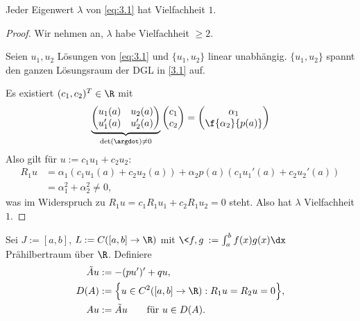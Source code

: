 \begin{st} \label{3.8}
	Jeder Eigenwert $\lambda$ von \eqref{eq:3.1} hat Vielfachheit $1$.
	\begin{proof}
		Wir nehmen an, $\lambda$ habe Vielfachheit $\ge 2$.

		Seien $u_1, u_2$ Lösungen von \eqref{eq:3.1} und $\{u_1,u_2\}$ linear unabhängig.
		$\{u_1,u_2\}$ spannt den ganzen Lösungsraum der DGL in \eqref{3.1} auf.

		Es existiert $(c_1,c_2)^T \in \R$ mit
		\[
			\underbrace{\begin{pmatrix}
				u_1(a) & u_2(a) \\
				u_1'(a) & u_2'(a)
			\end{pmatrix}}_{\det(\argdot) \neq 0}
			\begin{pmatrix}
				c_1 \\ c_2
			\end{pmatrix}
			= \begin{pmatrix}
				\alpha_1 \\ \f{\alpha_2}{p(a)}
			\end{pmatrix}
		\]
		Also gilt für $u:= c_1u_1 + c_2 u_2$:
		\begin{align*}
			R_1 u &= \alpha_1(c_1u_1(a) + c_2u_2(a)) + \alpha_2 p(a) (c_1u_1'(a) + c_2u_2'(a)) \\
			&= \alpha_1^2 + \alpha_2^2
			\neq 0,
		\end{align*}
		was im Widerspruch zu $R_1u = c_1R_1u_1 + c_2R_1u_2 = 0$ steht.
		Also hat $\lambda$ Vielfachheit $1$.
	\end{proof}
\end{st}

\begin{df} \label{3.9}
	Sei $J := [a,b]$, $L := C([a,b] \to \R)$ mit $\<f,g\> := \int_a^b f(x)g(x) \dx$ Prähilbertraum über $\R$.
	Definiere
	\begin{align}
		\label{eq:3.2}
		\begin{aligned}
			\tilde A u &:= -(pu')' + qu, \\
			D(A) &:= \Big\{ u \in C^2([a,b] \to \R) : R_1u = R_2u = 0 \Big\}, \\
			Au &:= \tilde A u \qquad \text{für $u\in D(A)$}.
		\end{aligned}
	\end{align}
\end{df}

